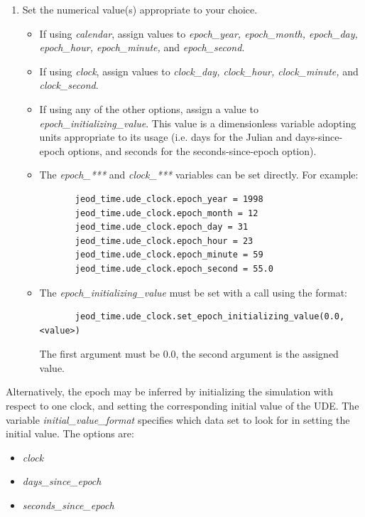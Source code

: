 \begin{enumerate}
\begin{itemize}
 \end{itemize}

 \item Set the numerical value(s) appropriate to your choice.
 \begin{itemize}
  \item If using \textit{calendar}, assign values to \textit{epoch\_year,
  epoch\_month, epoch\_day, epoch\_hour, epoch\_minute,} and
  \textit{epoch\_second}.
  \item If using \textit{clock}, assign values to \textit{clock\_day,
  clock\_hour, clock\_minute,} and \textit{clock\_second}.
  \item If using any of the other options, assign a value to
  \textit{epoch\_initializing\_value}.  This value is a dimensionless
  variable adopting units appropriate to its usage (i.e. days for the
  Julian and days-since-epoch options, and seconds for the
  seconds-since-epoch option).
  \item The \textit{epoch\_***} and \textit{clock\_***} variables can be set
  directly.  For example:
  \begin{verbatim}
       jeod_time.ude_clock.epoch_year = 1998
       jeod_time.ude_clock.epoch_month = 12
       jeod_time.ude_clock.epoch_day = 31
       jeod_time.ude_clock.epoch_hour = 23
       jeod_time.ude_clock.epoch_minute = 59
       jeod_time.ude_clock.epoch_second = 55.0
  \end{verbatim}
  \item The \textit{epoch\_initializing\_value} must be set with a call
  using the format:
  \begin{verbatim}
       jeod_time.ude_clock.set_epoch_initializing_value(0.0,<value>)
  \end{verbatim}
  The first argument must be 0.0, the second argument is the assigned
  value.
 \end{itemize}
\end{enumerate}

Alternatively, the epoch may be inferred by initializing the simulation
with respect to one clock, and setting the corresponding initial value of
the UDE.
The variable \textit{initial\_value\_format} specifies which data
set to look for  in  setting the initial value.  The options are:
  \begin{itemize}
   \item \textit{clock}
   \item \textit{days\_since\_epoch}
   \item \textit{seconds\_since\_epoch}
  \end{itemize}

